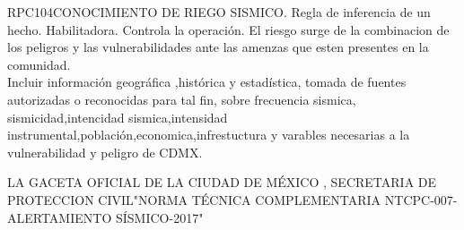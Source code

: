 \begin{BusinessRule}{RPC104}{CONOCIMIENTO DE RIEGO SISMICO.}{
		Regla de inferencia de un hecho.
	}{
		Habilitadora. 
	}{
		Controla la operación. %
	}
	\BRItem[Descripción:] El riesgo surge de la combinacion de los peligros y las vulnerabilidades ante las amenzas que esten presentes en la comunidad.\\Incluir información geográfica ,histórica y estadística, tomada de fuentes autorizadas o reconocidas para tal fin, sobre frecuencia sismica, sismicidad,intencidad sismica,intensidad instrumental,población,economica,infrestuctura y varables necesarias a la vulnerabilidad y peligro de CDMX.
	
	
	 LA GACETA OFICIAL DE LA CIUDAD DE MÉXICO , SECRETARIA DE PROTECCION CIVIL"NORMA TÉCNICA COMPLEMENTARIA NTCPC-007-ALERTAMIENTO SÍSMICO-2017"
\end{BusinessRule}
